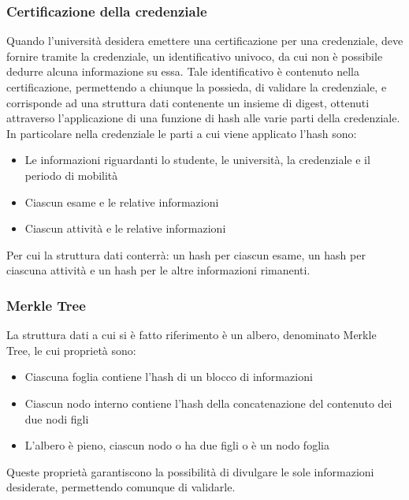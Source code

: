 \documentclass[a4paper,12pt]{article}
\begin{document}
\subsubsection{Certificazione della credenziale}
Quando l'università desidera emettere una certificazione per una credenziale, deve fornire tramite la credenziale, un identificativo univoco, da cui non è possibile dedurre alcuna informazione su essa. 
Tale identificativo è contenuto nella certificazione, permettendo a chiunque la possieda, di validare la credenziale, e corrisponde ad una struttura dati contenente un insieme di digest, ottenuti attraverso l'applicazione di una funzione di hash alle varie parti della credenziale. In particolare nella credenziale le parti a cui viene applicato l'hash sono: 
\begin{itemize}
    \item Le informazioni riguardanti lo studente, le università, la credenziale e il periodo di mobilità 
    \item Ciascun esame e le relative informazioni 
    \item Ciascun attività e le relative informazioni
\end{itemize}
Per cui la struttura dati conterrà: un hash per ciascun esame, un hash per ciascuna attività e un hash per le altre informazioni rimanenti. 
\subsubsection{Merkle Tree}
La struttura dati a cui si è fatto riferimento è un albero, denominato Merkle Tree, le cui proprietà sono: 
\begin{itemize}
    \item Ciascuna foglia contiene l'hash di un blocco di informazioni 
    \item Ciascun nodo interno contiene l'hash della concatenazione del contenuto dei due nodi figli 
    \item L'albero è pieno, ciascun nodo o ha due figli o è un nodo foglia 
\end{itemize}
Queste proprietà garantiscono la possibilità di divulgare le sole informazioni desiderate, permettendo comunque di validarle. 
\end{document}
